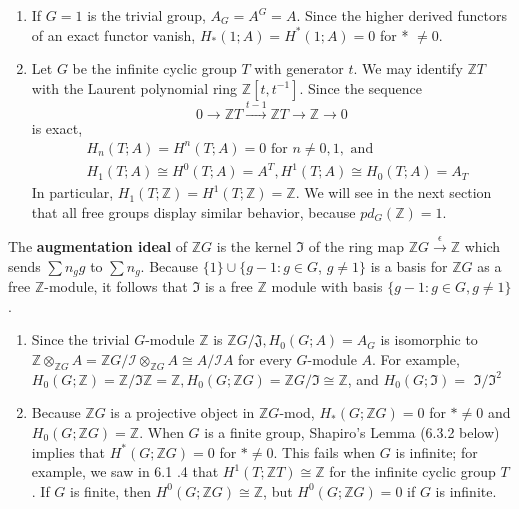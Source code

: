 \begin{example}
    \begin{enumerate}
        \item If $G=1$ is the trivial group, $A_G=A^G=A$. Since the higher derived functors of an exact functor vanish, $H_*(1 ; A)=H^*(1 ; A)=0$ for * $\neq 0$.
        \item Let $G$ be the infinite cyclic group $T$ with generator $t$. We may identify $\mathbb{Z} T$ with the Laurent polynomial ring $\mathbb{Z}\left[t, t^{-1}\right]$. Since the sequence $$
0 \rightarrow \mathbb{Z} T \xrightarrow{t-1} \mathbb{Z} T \rightarrow \mathbb{Z} \rightarrow 0
$$
is exact,
$$
\begin{aligned}
& H_n(T ; A)=H^n(T ; A)=0 \text { for } n \neq 0,1, \text { and } \\
& H_1(T ; A) \cong H^0(T ; A)=A^T, H^1(T ; A) \cong H_0(T ; A)=A_T
\end{aligned}
$$
In particular, $H_1(T ; \mathbb{Z})=H^1(T ; \mathbb{Z})=\mathbb{Z}$. We will see in the next section that all free groups display similar behavior, because $p d_G(\mathbb{Z})=1$.
    \end{enumerate}
\end{example}

The \textbf{augmentation ideal} of $\mathbb{Z} G$ is the kernel $\mathfrak{I}$ of the ring map $\mathbb{Z} G \xrightarrow{\epsilon} \mathbb{Z}$ which sends $\sum n_g g$ to $\sum n_g$. Because $\{1\} \cup\{g-1: g \in G$, $g \neq 1\}$ is a basis for $\mathbb{Z} G$ as a free $\mathbb{Z}$-module, it follows that $\mathfrak{I}$ is a free $\mathbb{Z}$ module with basis $\{g-1: g \in G, g \neq 1\}$.

\begin{example}
    \begin{enumerate}
        \item Since the trivial $G$-module $\mathbb{Z}$ is $\mathbb{Z} G / \mathfrak{J}, H_0(G ; A)=A_G$ is isomorphic to $\mathbb{Z} \otimes_{\mathbb{Z} G} A=\mathbb{Z} G / \mathcal{I} \otimes_{\mathbb{Z} G} A \cong A / \mathcal{I} A$ for every $G$-module $A$. For example, $H_0(G ; \mathbb{Z})=\mathbb{Z} / \mathfrak{I} \mathbb{Z}=\mathbb{Z}, H_0(G ; \mathbb{Z} G)=\mathbb{Z} G / \mathfrak{I} \cong \mathbb{Z}$, and $H_0(G ; \mathfrak{I})=$ $\mathfrak{I} / \mathfrak{I}^2$

        \item Because $\mathbb{Z} G$ is a projective object in $\mathbb{Z} G$-mod, $H_*(G ; \mathbb{Z} G)=0$ for $* \neq 0$ and $H_0(G ; \mathbb{Z} G)=\mathbb{Z}$. When $G$ is a finite group, Shapiro's Lemma (6.3.2 below) implies that $H^*(G ; \mathbb{Z} G)=0$ for $* \neq 0$. This fails when $G$ is infinite; for example, we saw in 6.1 .4 that $H^1(T ; \mathbb{Z} T) \cong \mathbb{Z}$ for the infinite cyclic group $T$. If $G$ is finite, then $H^0(G ; \mathbb{Z} G) \cong \mathbb{Z}$, but $H^0(G ; \mathbb{Z} G)=0$ if $G$ is infinite.
    \end{enumerate}
\end{example}

